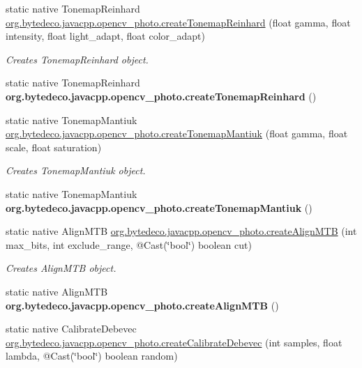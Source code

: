 \begin{DoxyCompactItemize}
static native Tonemap\+Reinhard \hyperlink{group__photo__hdr_gaa8a5689f2ff5c92529865de652f8cfba}{org.\+bytedeco.\+javacpp.\+opencv\+\_\+photo.\+create\+Tonemap\+Reinhard} (float gamma, float intensity, float light\+\_\+adapt, float color\+\_\+adapt)
\begin{DoxyCompactList}\small\item\em Creates Tonemap\+Reinhard object. \end{DoxyCompactList}\item 
\mbox{\label{group__photo__hdr_ga2edacee07ac714e48dd0cbe0fffd3ea0}} 
static native Tonemap\+Reinhard {\bfseries org.\+bytedeco.\+javacpp.\+opencv\+\_\+photo.\+create\+Tonemap\+Reinhard} ()
\item 
static native Tonemap\+Mantiuk \hyperlink{group__photo__hdr_ga26b6108696f057aeaf49b8d9a454da00}{org.\+bytedeco.\+javacpp.\+opencv\+\_\+photo.\+create\+Tonemap\+Mantiuk} (float gamma, float scale, float saturation)
\begin{DoxyCompactList}\small\item\em Creates Tonemap\+Mantiuk object. \end{DoxyCompactList}\item 
\mbox{\label{group__photo__hdr_ga8b6c37ae8aa9c20f35129b6a6e54f478}} 
static native Tonemap\+Mantiuk {\bfseries org.\+bytedeco.\+javacpp.\+opencv\+\_\+photo.\+create\+Tonemap\+Mantiuk} ()
\item 
static native Align\+M\+TB \hyperlink{group__photo__hdr_ga07eeedb34057b6d4d7c8679fda18175f}{org.\+bytedeco.\+javacpp.\+opencv\+\_\+photo.\+create\+Align\+M\+TB} (int max\+\_\+bits, int exclude\+\_\+range, @Cast(\char`\"{}bool\char`\"{}) boolean cut)
\begin{DoxyCompactList}\small\item\em Creates Align\+M\+TB object. \end{DoxyCompactList}\item 
\mbox{\label{group__photo__hdr_ga69c6d45c346c9bdc274c1ed58bc07743}} 
static native Align\+M\+TB {\bfseries org.\+bytedeco.\+javacpp.\+opencv\+\_\+photo.\+create\+Align\+M\+TB} ()
\item 
static native Calibrate\+Debevec \hyperlink{group__photo__hdr_gada8b25f072e80141d53f66754675dbec}{org.\+bytedeco.\+javacpp.\+opencv\+\_\+photo.\+create\+Calibrate\+Debevec} (int samples, float lambda, @Cast(\char`\"{}bool\char`\"{}) boolean random)

\end{DoxyCompactItemize}
